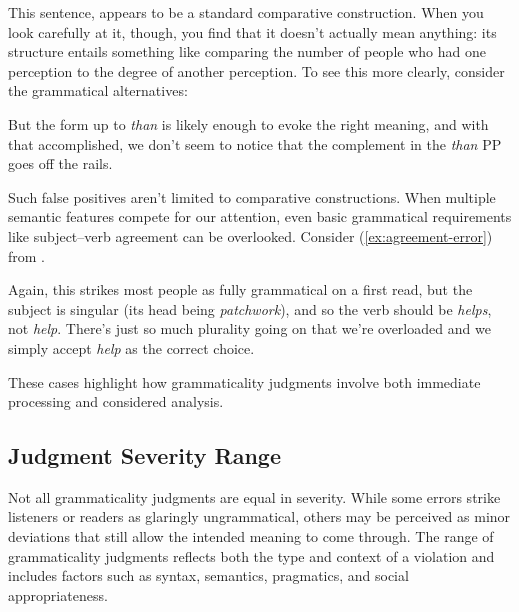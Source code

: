 This sentence, appears to be a standard comparative construction. When you look carefully at it, though, you find that it doesn't actually mean anything: its structure entails something like comparing the number of people who had one perception to the degree of another perception. To see this more clearly, consider the grammatical alternatives:

\z

But the form up to \textit{than} is likely enough to evoke the right meaning, and with that accomplished, we don't seem to notice that the complement in the \textit{than} PP goes off the rails.

Such false positives aren't limited to comparative constructions. When multiple semantic features compete for our attention, even basic grammatical requirements like subject--verb agreement can be overlooked. Consider (\ref{ex:agreement-error}) from \citet{corbett2016}.

\label{ex:agreement-error}
\z

Again, this strikes most people as fully grammatical on a first read, but the subject is singular (its head being \textit{patchwork}), and so the verb should be \textit{helps}, not \textit{help}. There's just so much plurality going on that we're overloaded and we simply accept \textit{help} as the correct choice.

These cases highlight how grammaticality judgments involve both immediate processing and considered analysis.

\subsection{Judgment Severity Range}

Not all grammaticality judgments are equal in severity. While some errors strike listeners or readers as glaringly ungrammatical, others may be perceived as minor deviations that still allow the intended meaning to come through. The range of grammaticality judgments reflects both the type and context of a violation and includes factors such as syntax, semantics, pragmatics, and social appropriateness.

